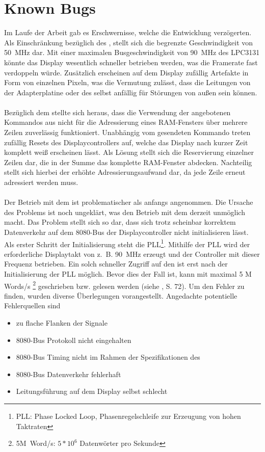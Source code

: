 \section{Known Bugs}
\label{teila_knownbugs}
Im Laufe der Arbeit gab es Erschwernisse, welche die Entwicklung verzögerten. 
Als Einschränkung bezüglich des , stellt sich die begrenzte Geschwindigkeit von 50~MHz dar. Mit einer maximalen Busgeschwindigkeit von 90~MHz des LPC3131 könnte das Display wesentlich schneller betrieben werden, was die Framerate fast verdoppeln würde. Zusätzlich erscheinen auf dem Display zufällig Artefakte in Form von einzelnen Pixeln, was die Vermutung zulässt, dass die Leitungen von der Adapterplatine oder des  selbst anfällig für Störungen von außen sein können. \\ \\
Bezüglich dem  stellte sich heraus, dass die Verwendung der angebotenen Kommandos aus  nicht für die Adressierung eines RAM-Fensters über mehrere Zeilen zuverlässig funktioniert. Unabhängig vom gesendeten Kommando treten zufällig Resets des Displaycontrollers auf, welche das Display nach kurzer Zeit komplett weiß erscheinen lässt. Als Lösung stellt sich die Reservierung einzelner Zeilen dar, die in der Summe das komplette RAM-Fenster abdecken. Nachteilig stellt sich hierbei der erhöhte Adressierungsaufwand dar, da jede Zeile erneut adressiert werden muss.\\ \\
Der Betrieb mit dem  ist problematischer als anfangs angenommen. Die Ursache des Problems ist noch ungeklärt, was den Betrieb mit dem  derzeit unmöglich macht.
Das Problem stellt sich so dar, dass sich trotz scheinbar korrektem Datenverkehr auf dem 8080-Bus der Displaycontroller nicht initialisieren lässt. Als erster Schritt der Initialisierung steht die PLL\footnote{PLL: Phase Locked Loop, Phasenregelschleife zur Erzeugung von hohen Taktraten}. Mithilfe der PLL wird der erforderliche Displaytakt von z.~B. 90~MHz erzeugt und der Controller mit dieser Frequenz betrieben. Ein solch schneller Zugriff auf den  ist erst nach der Initialisierung der PLL möglich. Bevor dies der Fall ist, kann mit maximal 5 M Words/s \footnote{5M~Word/s: $5*10^6$ Datenwörter pro Sekunde} geschrieben bzw. gelesen werden (siehe \cite{SSD2008}, S. 72). Um den Fehler zu finden, wurden diverse Überlegungen vorangestellt. Angedachte potentielle Fehlerquellen sind
\begin{itemize}
\item zu flache Flanken der Signale
\item 8080-Bus Protokoll nicht eingehalten
\item 8080-Bus Timing nicht im Rahmen der Spezifikationen des 
\item 8080-Bus Datenverkehr fehlerhaft
\item Leitungsführung auf dem Display selbst schlecht
\end{itemize}
